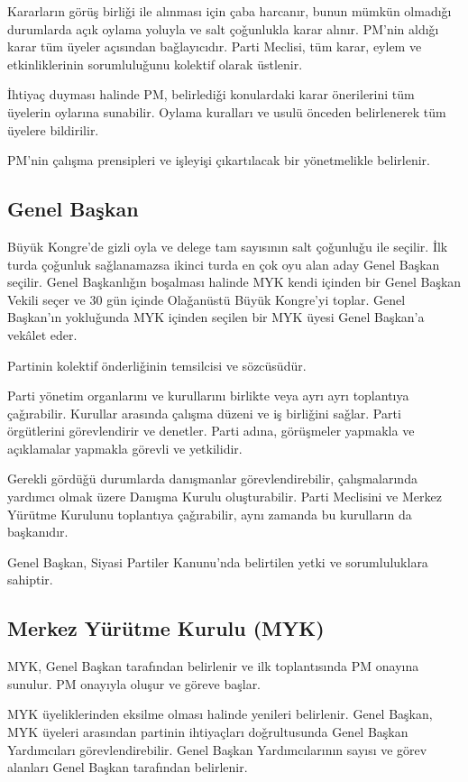 \documentclass[11pt]{article} %
\begin{document}
Kararların görüş birliǧi ile alınması için çaba harcanır, bunun mümkün olmadıǧı durumlarda açık oylama yoluyla ve salt çoǧunlukla karar alınır. PM’nin aldıǧı karar tüm üyeler açısından baǧlayıcıdır. Parti Meclisi, tüm karar, eylem ve etkinliklerinin sorumluluǧunu kolektif olarak üstlenir.

İhtiyaç duyması halinde PM, belirlediǧi konulardaki karar önerilerini tüm üyelerin oylarına sunabilir. Oylama kuralları ve usulü önceden belirlenerek tüm üyelere bildirilir.

PM’nin çalışma prensipleri ve işleyişi çıkartılacak bir yönetmelikle belirlenir. 
\subsection{Genel Başkan}
Büyük Kongre’de gizli oyla ve delege tam sayısının salt çoǧunluǧu ile seçilir. İlk
turda çoǧunluk saǧlanamazsa ikinci turda en çok oyu alan aday Genel Başkan seçilir. Genel Başkanlıǧın boşalması halinde MYK kendi içinden bir Genel Başkan Vekili seçer ve 30 gün içinde Olaǧanüstü Büyük Kongre’yi toplar. Genel Başkan’ın yokluǧunda MYK içinden seçilen bir MYK üyesi Genel Başkan’a vekâlet eder.

Partinin kolektif önderliǧinin temsilcisi ve sözcüsüdür.

Parti yönetim organlarını ve kurullarını birlikte veya ayrı ayrı toplantıya çaǧırabilir. Kurullar arasında çalışma düzeni ve iş birliǧini saǧlar. Parti örgütlerini görevlendirir ve denetler.
Parti adına, görüşmeler yapmakla ve açıklamalar yapmakla görevli ve yetkilidir.

Gerekli gördüǧü durumlarda danışmanlar görevlendirebilir, çalışmalarında yardımcı olmak üzere Danışma Kurulu oluşturabilir. Parti Meclisini ve Merkez Yürütme Kurulunu toplantıya çaǧırabilir, aynı zamanda bu kurulların da başkanıdır.

Genel Başkan, Siyasi Partiler Kanunu’nda belirtilen yetki ve sorumluluklara sahiptir.

\subsection{Merkez Yürütme Kurulu (MYK)}
MYK, Genel Başkan tarafından belirlenir ve ilk toplantısında PM onayına sunulur. PM onayıyla oluşur ve göreve başlar.

MYK üyeliklerinden eksilme olması halinde yenileri belirlenir. Genel Başkan, MYK üyeleri arasından partinin ihtiyaçları doǧrultusunda Genel Başkan Yardımcıları görevlendirebilir. Genel Başkan Yardımcılarının sayısı ve görev alanları Genel Başkan tarafından belirlenir.
\end{document}
